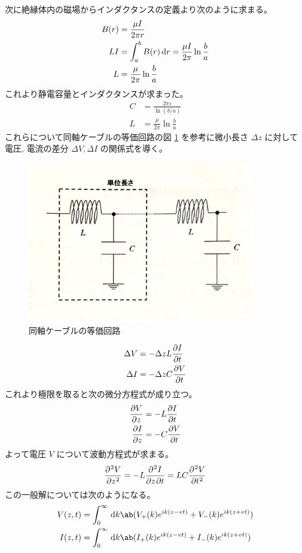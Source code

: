 \documentclass[uplatex,dvipdfmx,a4paper,11pt]{jlreq}
\numberwithin{equation}{section}
\theoremstyle{definition}
\begin{document}
次に絶縁体内の磁場からインダクタンスの定義より次のように求まる。
\begin{align}
  B(r) & = \frac{\mu I}{2\pi r}                                   \\
  LI   & = \int_a^b B(r)\dl{r} = \frac{\mu I}{2\pi}\ln\frac{b}{a} \\
  L    & = \frac{\mu}{2\pi}\ln\frac{b}{a}
\end{align}
これより静電容量とインダクタンスが求まった。
\begin{align}
  C & = \frac{2\pi\varepsilon}{\ln(b/a)} \\
  L & = \frac{\mu}{2\pi}\ln\frac{b}{a}
\end{align}
これらについて同軸ケーブルの等価回路の図 \ref{fig:circuit} を参考に微小長さ $\Delta z$ に対して電圧, 電流の差分 $\Delta V, \Delta I$ の関係式を導く。
\begin{figure}[htbp]
  \centering
  \includegraphics[width=10cm]{./assets/circuit.jpg}
  \caption{同軸ケーブルの等価回路}
  \label{fig:circuit}
\end{figure}
\begin{align}
  \Delta V & = -\Delta z L\diffp{I}{t} \\
  \Delta I & = -\Delta z C\diffp{V}{t}
\end{align}
これより極限を取ると次の微分方程式が成り立つ。
\begin{align}
  \diffp{V}{z} & = -L\diffp{I}{t} \\
  \diffp{I}{z} & = -C\diffp{V}{t}
\end{align}
よって電圧 $V$ について波動方程式が求まる。
\begin{align}
  \diffp[2]{V}{z} = -L\diffp{I}{z,t} = LC\diffp[2]{V}{t}
\end{align}
この一般解については次のようになる。
\begin{align}
  V(z, t) & = \int_0^\infty\dl{k}\ab(V_+(k)e^{ik(z - vt)} + V_-(k)e^{ik(z + vt)}) \\
  I(z, t) & = \int_0^\infty\dl{k}\ab(I_+(k)e^{ik(z - vt)} + I_-(k)e^{ik(z + vt)})
\end{align}
\end{document}
